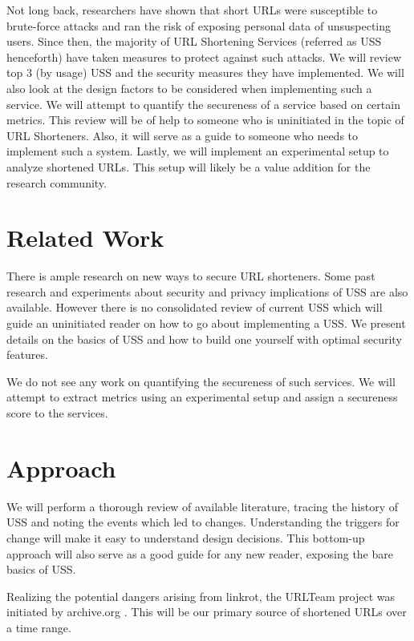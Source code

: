 \documentclass[sigconf, nonacm]{acmart}
\begin{document}
Not long back, researchers have shown that short URLs were susceptible to brute-force attacks \cite{paper1} and ran the risk of exposing personal data of unsuspecting users. Since then, the majority of URL Shortening Services (referred as USS henceforth) have taken measures to protect against such attacks. We will review top 3 (by usage) USS and the security measures they have implemented. We will also look at the design factors to be considered when implementing such a service. We will attempt to quantify the secureness of a service based on certain metrics. This review will be of help to someone who is uninitiated in the topic of URL Shorteners. Also, it will serve as a guide to someone who needs to implement such a system. Lastly, we will implement an experimental setup to analyze shortened URLs. This setup will likely be a value addition for the research community. 

\section{Related Work}

There is ample research \cite{paper6} \cite{paper5} \cite{paper4} on new ways to secure URL shorteners. Some past research and experiments about security and privacy implications of USS are also available. However there is no consolidated review of current USS which will guide an uninitiated reader on how to go about implementing a USS. We present details on the basics of USS and how to build one yourself with optimal security features. 

We do not see any work on quantifying the secureness of such services. We will attempt to extract metrics using an experimental setup and assign a secureness score to the services. 

\section{Approach}

We will perform a thorough review of available literature, tracing the history of USS and noting the events which led to changes. Understanding the triggers for change will make it easy to understand design decisions. This bottom-up approach will also serve as a good guide for any new reader, exposing the bare basics of USS. 

Realizing the potential dangers arising from linkrot, the URLTeam project was initiated by archive.org \cite{link1}. This will be our primary source of shortened URLs over a time range. 
\end{document}

